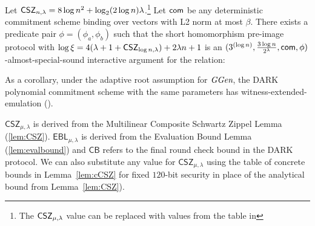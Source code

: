 \begin{theorem}
Let $\CSZ[n] = 8 \log n^{2} + \log_2 (2 \log n) \lambda$.\footnote{The $\CSZ$ value can be replaced with values from the table in }  Let $\com$ be any deterministic commitment scheme binding over vectors with L2 norm at most $\beta$. There exists a predicate pair $\phi = (\phi_a, \phi_b)$ such that the short homomorphism pre-image protocol with $\log \xi = 4(\lambda + 1 + \CSZ[\log n]) + 2\lambda n + 1$ is an $(3^{(\log n)}, \frac{3 \log n}{2^\lambda},\com,\phi)$-almost-special-sound interactive argument for the relation: 



As a corollary, under the adaptive root assumption for $\ggen$, the DARK polynomial commitment scheme with the same parameters has witness-extended-emulation ().
\end{theorem}

\begin{remark} $\mathsf{CSZ}_{\mu, \lambda}$ is derived from the Multilinear Composite Schwartz Zippel Lemma (\cref{lem:CSZ}). $\mathsf{EBL}_{\mu, \lambda}$ is derived from the Evaluation Bound Lemma (\cref{lem:evalbound}) and $\mathsf{CB}$ refers to the final round check bound in the DARK protocol. We can also substitute any value for $\mathsf{CSZ}_{\mu,\lambda}$ using the table of concrete bounds in Lemma~\ref{lem:cCSZ} for fixed $120$-bit security in place of the analytical bound from Lemma~\ref{lem:CSZ}).%
\end{remark}



 